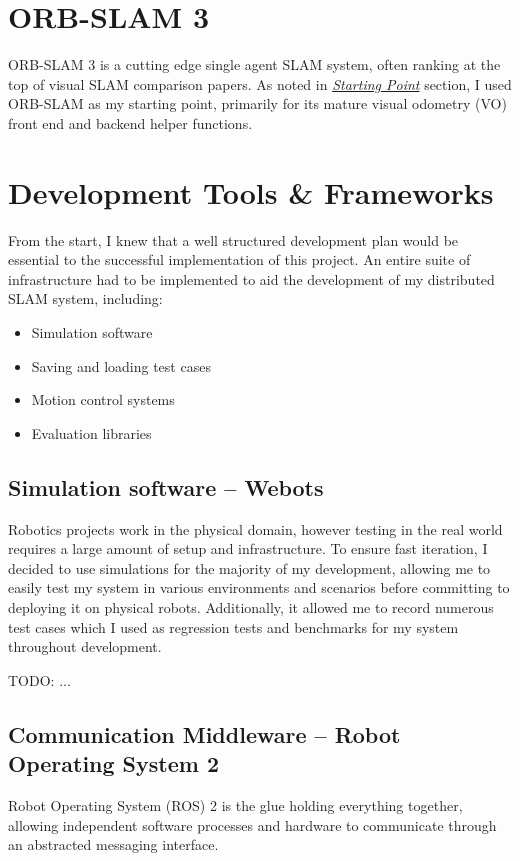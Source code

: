 \section{ORB-SLAM 3}
\label{sec:orb-slam-3}
ORB-SLAM 3 is a cutting edge single agent SLAM system, often ranking at the top of visual SLAM comparison papers. As noted in \hyperref[sec:starting-point]{\textit{Starting Point}} section, I used ORB-SLAM as my starting point, primarily for its mature visual odometry (VO) front end and backend helper functions.

\section{Development Tools \& Frameworks}
\label{sec:development-tools-and-frameworks}
From the start, I knew that a well structured development plan would be essential to the successful implementation of this project. An entire suite of infrastructure had to be implemented to aid the development of my distributed SLAM system, including: \noparskip
{
    \begin{itemize}[nosep]
        \item Simulation software
        \item Saving and loading test cases
        \item Motion control systems
        \item Evaluation libraries
    \end{itemize}
}

\subsection{Simulation software – Webots}
\label{sec:webots-simulator}

Robotics projects work in the physical domain, however testing in the real world requires a large amount of setup and infrastructure. To ensure fast iteration, I decided to use simulations for the majority of my development, allowing me to easily test my system in various environments and scenarios before committing to deploying it on physical robots. Additionally, it allowed me to record numerous test cases which I used as regression tests and benchmarks for my system throughout development.

TODO: ...


\subsection{Communication Middleware – Robot Operating System 2}
\label{sec:ros-2}
Robot Operating System (ROS) 2 is the glue holding everything together, allowing independent software processes and hardware to communicate through an abstracted messaging interface.


